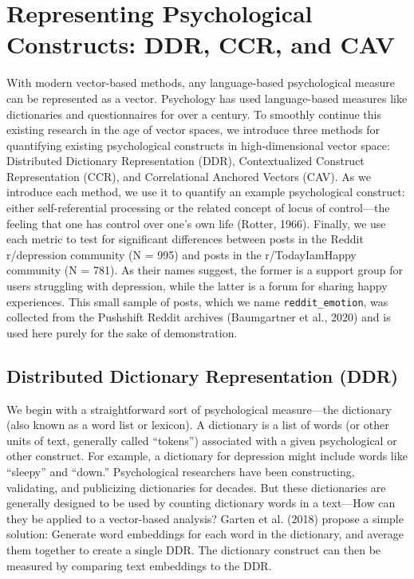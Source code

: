 \documentclass[
  man,
  floatsintext,
  longtable,
  nolmodern,
  notxfonts,
  notimes,
  colorlinks=true,linkcolor=blue,citecolor=blue,urlcolor=blue]{apa7}
\begin{document}
\section{Representing Psychological Constructs: DDR, CCR, and
CAV}\label{representing-psychological-constructs-ddr-ccr-and-cav}

With modern vector-based methods, any language-based psychological
measure can be represented as a vector. Psychology has used
language-based measures like dictionaries and questionnaires for over a
century. To smoothly continue this existing research in the age of
vector spaces, we introduce three methods for quantifying existing
psychological constructs in high-dimensional vector space: Distributed
Dictionary Representation (DDR), Contextualized Construct Representation
(CCR), and Correlational Anchored Vectors (CAV). As we introduce each
method, we use it to quantify an example psychological construct: either
self-referential processing or the related concept of locus of
control---the feeling that one has control over one's own life (Rotter,
1966). Finally, we use each metric to test for significant differences
between posts in the Reddit r/depression community (N = 995) and posts
in the r/TodayIamHappy community (N = 781). As their names suggest, the
former is a support group for users struggling with depression, while
the latter is a forum for sharing happy experiences. This small sample
of posts, which we name \texttt{reddit\_emotion}, was collected from the
Pushshift Reddit archives (Baumgartner et al., 2020) and is used here
purely for the sake of demonstration.

\subsection{Distributed Dictionary Representation
(DDR)}\label{distributed-dictionary-representation-ddr}

We begin with a straightforward sort of psychological measure---the
dictionary (also known as a word list or lexicon). A dictionary is a
list of words (or other units of text, generally called ``tokens'')
associated with a given psychological or other construct. For example, a
dictionary for depression might include words like ``sleepy'' and
``down.'' Psychological researchers have been constructing, validating,
and publicizing dictionaries for decades. But these dictionaries are
generally designed to be used by counting dictionary words in a
text---How can they be applied to a vector-based analysis? Garten et al.
(2018) propose a simple solution: Generate word embeddings for each word
in the dictionary, and average them together to create a single DDR. The
dictionary construct can then be measured by comparing text embeddings
to the DDR.
\end{document}
